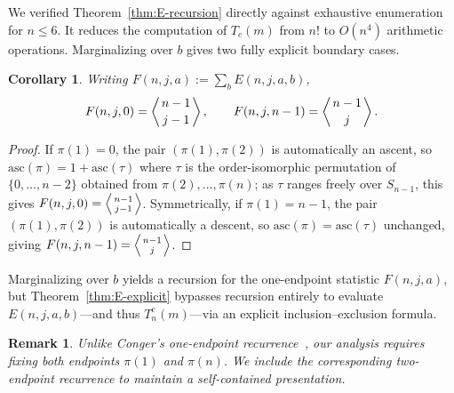 \documentclass[11pt,a4paper]{amsart}
\newtheorem{corollary}[theorem]{Corollary}
\newtheorem{remark}[theorem]{Remark}
\newcommand{\1}{\mathbf{1}}
\newcommand{\EN}[1]{\left\langle #1 \right\rangle}
\begin{document}
We verified Theorem~\ref{thm:E-recursion} directly against exhaustive enumeration for $n\le6$. It reduces the computation of $T_c(m)$ from $n!$ to $O(n^4)$ arithmetic operations. Marginalizing over $b$ gives two fully explicit boundary cases.

\begin{corollary}\label{cor:boundary}
Writing $F(n,j,a):=\sum_bE(n,j,a,b)$,
\[
F(n,j,0) = \EN{n-1\atop j-1}, \qquad F(n,j,n-1) = \EN{n-1\atop j}.
\]
\end{corollary}
\begin{proof}
If $\pi(1)=0$, the pair $(\pi(1),\pi(2))$ is automatically an ascent, so $\mathrm{asc}(\pi)=1+\mathrm{asc}(\tau)$ where $\tau$ is the order-isomorphic permutation of $\{0,\dots,n-2\}$ obtained from $\pi(2),\dots,\pi(n)$; as $\tau$ ranges freely over $S_{n-1}$, this gives $F(n,j,0)=\EN{n-1\atop j-1}$. Symmetrically, if $\pi(1)=n-1$, the pair $(\pi(1),\pi(2))$ is automatically a descent, so $\mathrm{asc}(\pi)=\mathrm{asc}(\tau)$ unchanged, giving $F(n,j,n-1)=\EN{n-1\atop j}$.
\end{proof}
Marginalizing over $b$ yields a recursion for the one-endpoint statistic $F(n,j,a)$, but Theorem~\ref{thm:E-explicit} bypasses recursion entirely to evaluate $E(n,j,a,b)$—and thus $T_n^c(m)$—via an explicit inclusion--exclusion formula.

\begin{remark}\label{rem:two-endpoint-recurrence}
Unlike Conger's one-endpoint recurrence~\cite[Eq.~(12)]{Conger2010}, our analysis requires fixing both endpoints $\pi(1)$ and $\pi(n)$. We include the corresponding two-endpoint recurrence to maintain a self-contained presentation.
\end{remark}
\end{document}
